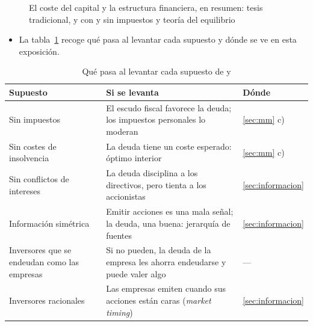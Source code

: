 \documentclass[11pt]{article}
\begin{document}
\begin{figure}[H]
\centering
\caption{El coste del capital y la estructura financiera, en resumen: tesis tradicional,  y  con y sin impuestos y teoría del equilibrio}\label{fig:coste-capital}
\end{figure}

\begin{itemize}
\item La tabla~\ref{tab:supuestos-mm} recoge qué pasa al levantar cada supuesto y dónde se ve en esta exposición.
\end{itemize}

\begin{table}[H]
\centering
\caption{Qué pasa al levantar cada supuesto de  y }\label{tab:supuestos-mm}
\begin{tabular}{>{\raggedright\arraybackslash}m{4cm}>{\raggedright\arraybackslash}m{7.2cm}>{\raggedright\arraybackslash}m{2.6cm}}
\toprule
\rowcolor{tceeazulpalido}\textbf{Supuesto} & \textbf{Si se levanta} & \textbf{Dónde} \\
\midrule
Sin impuestos & El escudo fiscal favorece la deuda; los impuestos personales lo moderan & \ref{sec:mm} c) \\
Sin costes de insolvencia & La deuda tiene un coste esperado: óptimo interior & \ref{sec:mm} c) \\
Sin conflictos de intereses & La deuda disciplina a los directivos, pero tienta a los accionistas & \ref{sec:informacion} \\
Información simétrica & Emitir acciones es una mala señal; la deuda, una buena: jerarquía de fuentes & \ref{sec:informacion} \\
Inversores que se endeudan como las empresas & Si no pueden, la deuda de la empresa les ahorra endeudarse y puede valer algo & --- \\
Inversores racionales & Las empresas emiten cuando sus acciones están caras (\emph{market timing}) & \ref{sec:informacion} \\
\bottomrule
\end{tabular}
\end{table}
\end{document}
